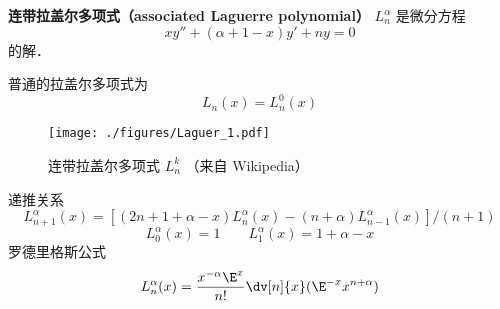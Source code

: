 
\begin{issues}
\issueDraft
\end{issues}

\textbf{连带拉盖尔多项式（associated Laguerre polynomial）} $L_{n}^\alpha$ 是微分方程
\begin{equation}
xy'' + (\alpha + 1 - x) y' + ny = 0
\end{equation}
的解．

普通的拉盖尔多项式为
\begin{equation}
L_n(x) = L_n^0(x)
\end{equation}

\begin{figure}[ht]
\centering
\texttt{[image: ./figures/Laguer\_1.pdf]}
\caption{连带拉盖尔多项式 $L_n^k$ （来自 Wikipedia）} \label{Laguer_fig1}
\end{figure}

递推关系
\begin{equation}
L_{n+1}^\alpha (x) = [(2n + 1 + \alpha  - x)L_n^\alpha (x) - (n + \alpha )L_{n - 1}^\alpha (x)]/(n + 1)
\end{equation}
\begin{equation}
L_0^\alpha (x) = 1
\qquad
L_1^\alpha (x) = 1 + \alpha  - x
\end{equation}  
罗德里格斯公式
\begin{equation}
L_n^\alpha (x) = \frac{x^{-\alpha} \E^x}{n!} \dv[n]{x} (\E^{-x} x^{n+\alpha})
\end{equation}

